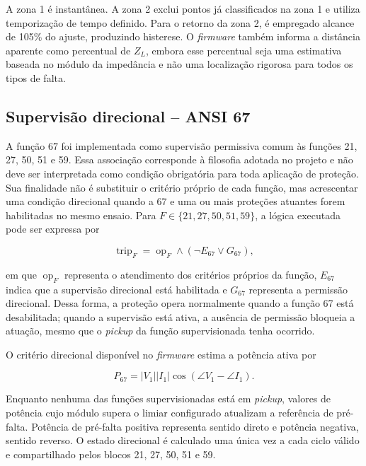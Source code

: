 A zona 1 é instantânea. A zona 2 exclui pontos já classificados na zona 1 e utiliza temporização de tempo definido. Para o retorno da zona 2, é empregado alcance de 105\% do ajuste, produzindo histerese. O \textit{firmware} também informa a distância aparente como percentual de $Z_L$, embora esse percentual seja uma estimativa baseada no módulo da impedância e não uma localização rigorosa para todos os tipos de falta.

\subsection{Supervisão direcional -- ANSI 67}
\label{sec:hierarquia-protecoes}

A função 67 foi implementada como supervisão permissiva comum às funções 21, 27, 50, 51 e 59. Essa associação corresponde à filosofia adotada no projeto e não deve ser interpretada como condição obrigatória para toda aplicação de proteção. Sua finalidade não é substituir o critério próprio de cada função, mas acrescentar uma condição direcional quando a 67 e uma ou mais proteções atuantes forem habilitadas no mesmo ensaio. Para $F\in\{21,27,50,51,59\}$, a lógica executada pode ser expressa por

\begin{equation}
  \operatorname{trip}_F=\operatorname{op}_F\land
  \left(\neg E_{67}\lor G_{67}\right),
  \label{eq:permissivo-67}
\end{equation}

em que $\operatorname{op}_F$ representa o atendimento dos critérios próprios da função, $E_{67}$ indica que a supervisão direcional está habilitada e $G_{67}$ representa a permissão direcional. Dessa forma, a proteção opera normalmente quando a função 67 está desabilitada; quando a supervisão está ativa, a ausência de permissão bloqueia a atuação, mesmo que o \textit{pickup} da função supervisionada tenha ocorrido.

O critério direcional disponível no \textit{firmware} estima a potência ativa por

\begin{equation}
  P_{67}=|V_1||I_1|\cos(\angle V_1-\angle I_1).
\end{equation}

Enquanto nenhuma das funções supervisionadas está em \textit{pickup}, valores de potência cujo módulo supera o limiar configurado atualizam a referência de pré-falta. Potência de pré-falta positiva representa sentido direto e potência negativa, sentido reverso. O estado direcional é calculado uma única vez a cada ciclo válido e compartilhado pelos blocos 21, 27, 50, 51 e 59.


